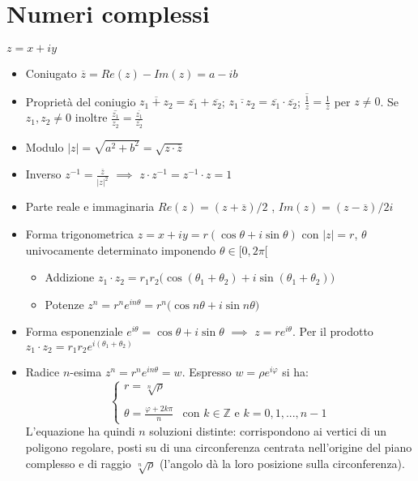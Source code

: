 \documentclass[10pt, oneside]{book}
\theoremstyle{plain}
\begin{document}
\chapter{Numeri complessi}
$z = x + iy$
\begin{itemize}
    \item Coniugato $\overline{z} = Re (z) - Im (z) = a -ib$
    \item Proprietà del coniugio $\overline{z_1 + z_2} = \overline{z_1} + \overline{z_2}$; $\overline{z_1 \cdot z_2} = \overline{z_1} \cdot \overline{z_2}$; $\overline{\frac{1}{z}} = \frac{1}{\overline{z}}$ per $z \neq 0$. Se $z_1, z_2 \neq 0$ inoltre $\overline{\frac{z_1}{z_2}} = \frac{\overline{z_1}}{\overline{z_2}}$
    \item Modulo $|z| = \sqrt{a^2 + b^2} = \sqrt{z \cdot \overline{z}}$
    \item Inverso $\displaystyle z^{-1} = \frac{\overline{z}}{|z|^2}$ $\implies$ $z \cdot z^{-1} = z^{-1} \cdot z = 1$
    \item Parte reale e immaginaria $Re(z) = (z + \overline{z}) / 2$ , $Im (z) = (z - \overline{z}) / 2i$
    \item Forma trigonometrica $z = x + iy = r (\cos \theta + i \sin \theta)$ con $|z| = r$, $\theta$ univocamente determinato imponendo $\theta \in [0, 2\pi[$
    \begin{itemize}[label = $\ast$]
        \item Addizione $\displaystyle z_1 \cdot z_2 = r_1 r_2 \big(\cos(\theta_1 + \theta_2) + i \sin(\theta_1 + \theta_2)\big)$
        \item Potenze $\displaystyle z^n = r^n e^{i n \theta} = r^n \big(\cos n \theta + i \sin n \theta\big)$
    \end{itemize}
    \item Forma esponenziale $e^{i \theta} = \cos \theta + i \sin \theta$ $\implies$ $z = r e^{i\theta}$. Per il prodotto $z_1 \cdot z_2 = r_1 r_2 e^{i (\theta_1 + \theta_2)}$
    \item Radice $n$-esima $z^n = r^n e^{i n\theta} = w$. Espresso $w = \rho e^{i \varphi}$ si ha:
    \[\begin{cases}
        \displaystyle r = \sqrt[n]{\rho} \\ \\
        \displaystyle \theta = \frac{\varphi + 2 k \pi}{n} & \textrm{con $k \in \mathbb{Z}$ e $k = 0, 1, ..., n-1$}
    \end{cases}\]
    L'equazione ha quindi $n$ soluzioni distinte: corrispondono ai vertici di un poligono regolare, posti su di una circonferenza centrata nell'origine del piano complesso e di raggio $\displaystyle \sqrt[n]{\rho}$ (l'angolo dà la loro posizione sulla circonferenza).
\end{itemize}
\end{document}

